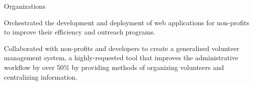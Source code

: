 \documentclass{resume} %
\begin{document}

\begin{workSection}{Organizations}
    \customItem[
        title=Bits of Good,
        keyHighlight=Developer,
        duration=January 2023\textendash{May 2024},
        location=Atlanta{,} GA
    ]
    \begin{bullets}
       \item Orchestrated the development and deployment of web applications for non-profits to improve their efficiency and outreach programs.
       \item Collaborated with non-profits and developers to create a generalized volunteer management system, a highly-requested tool that improves the administrative workflow by over 50\% by providing methods of organizing volunteers and centralizing information.

    \end{bullets}
     
\end{workSection}
\end{document}
